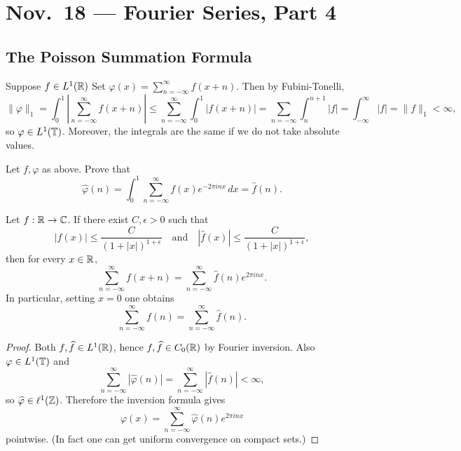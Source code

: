 \chapter{Nov.~18 --- Fourier Series, Part 4}

\section{The Poisson Summation Formula}

\begin{remark}
  Suppose $f \in L^1(\mathbb{R})$
  Set $\varphi(x) = \sum_{n = -\infty}^\infty f(x + n)$.
  Then by Fubini-Tonelli,
  \[
    \|\varphi\|_1
    = \int_0^1 \left|\sum_{n = -\infty}^\infty f(x + n)\right|
    \le 
    \sum_{n = -\infty}^\infty \int_0^1 |f(x + n)|
    = \sum_{n = -\infty} \int_{n}^{n + 1} |f|
    = \int_{-\infty}^\infty |f|
    = \|f\|_1 < \infty,
  \]
  so $\varphi \in L^1(\mathbb{T})$.
  Moreover, the integrals are the
  same if we do not take absolute
  values.
\end{remark}

\begin{exercise}
  Let $f, \varphi$ as above.
  Prove that
  \[
    \widehat{\varphi}(n)
    = \int_0^1 \sum_{n = -\infty}^\infty f(x) e^{-2\pi i n x} \, dx
    = \widehat{f}(n).
  \]
\end{exercise}

\begin{theorem}
  Let $f : \mathbb{R} \to \mathbb{C}$.
  If there exist $C, \epsilon > 0$
  such that
  \[
    |f(x)| \le \frac{C}{(1 + |x|)^{1 + \epsilon}}
    \quad \text{and} \quad
    |\widehat{f}(x)| \le \frac{C}{(1 + |x|)^{1 + \epsilon}},
  \]
  then for every $x \in \mathbb{R}$,
  \[
    \sum_{n = -\infty}^\infty f(x + n)
    = \sum_{n = -\infty}^\infty \widehat{f}(n) e^{2\pi i n x}.
  \]
  In particular, setting $x = 0$
  one obtains
  \[
    \sum_{n = -\infty}^\infty f(n)
    = \sum_{n = -\infty}^\infty \widehat{f}(n).
  \]
\end{theorem}

\begin{proof}
  Both $f, \widehat{f} \in L^1(\mathbb{R})$,
  hence $f, \widehat{f} \in C_0(\mathbb{R})$
  by Fourier inversion.
  Also $\varphi \in L^1(\mathbb{T})$ and
  \[
    \sum_{n = -\infty}^\infty
    |\widehat{\varphi}(n)|
    = \sum_{n = -\infty}^\infty
    |\widehat{f}(n)|
    < \infty,
  \]
  so $\widehat{\varphi} \in \ell^1(\mathbb{Z})$.
  Therefore the inversion formula gives
  \[
    \varphi(x) = \sum_{n = -\infty}^\infty \widehat{\varphi}(n) e^{2\pi i n x}
  \]
  pointwise. (In fact one can
  get uniform convergence on compact
  sets.)
\end{proof}


